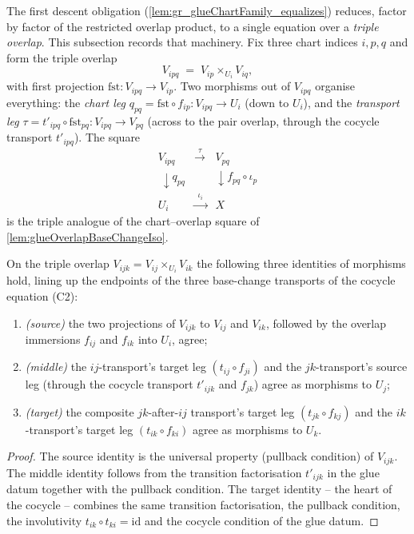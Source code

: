 The first descent obligation (\cref{lem:gr_glueChartFamily_equalizes}) reduces, factor
by factor of the restricted overlap product, to a single equation over a \emph{triple
overlap}. This subsection records that machinery. Fix three chart indices \(i, p, q\)
and form the triple overlap
\[
  V_{ipq} \;=\; V_{ip} \times_{U_i} V_{iq},
\]
with first projection \(\mathrm{fst} : V_{ipq} \to V_{ip}\). Two morphisms out of
\(V_{ipq}\) organise everything: the \emph{chart leg}
\(q_{pq} = \mathrm{fst}\circ f_{ip} : V_{ipq} \to U_i\) (down to \(U_i\)), and the
\emph{transport leg} \(\tau = t'_{ipq}\circ \mathrm{fst}_{pq} : V_{ipq} \to V_{pq}\)
(across to the pair overlap, through the cocycle transport \(t'_{ipq}\)). The square
\[
  \begin{array}{ccc}
    V_{ipq} & \xrightarrow{\ \ \tau\ \ } & V_{pq} \\
    \ \downarrow{\scriptstyle q_{pq}} & & \downarrow{\scriptstyle f_{pq}\circ \iota_p} \\
    U_i & \xrightarrow{\ \ \iota_i\ \ } & X
  \end{array}
\]
is the triple analogue of the chart--overlap square of \cref{lem:glueOverlapBaseChangeIso}.

\begin{lemma}\leanok
  \label{lem:gr_glueData_bridges}
  On the triple overlap \(V_{ijk} = V_{ij}\times_{U_i} V_{ik}\) the following three
  identities of morphisms hold, lining up the endpoints of the three base-change
  transports of the cocycle equation (C2):
  \begin{enumerate}
    \item \emph{(source)} the two projections of \(V_{ijk}\) to \(V_{ij}\) and \(V_{ik}\),
      followed by the overlap immersions \(f_{ij}\) and \(f_{ik}\) into \(U_i\),
      agree;
    \item \emph{(middle)} the \(ij\)-transport's target leg
      \((t_{ij}\circ f_{ji})\) and the \(jk\)-transport's source leg
      (through the cocycle transport \(t'_{ijk}\) and \(f_{jk}\)) agree as morphisms
      to \(U_j\);
    \item \emph{(target)} the composite \(jk\)-after-\(ij\) transport's target leg
      \((t_{jk}\circ f_{kj})\) and the \(ik\)-transport's target leg
      \((t_{ik}\circ f_{ki})\) agree as morphisms to \(U_k\).
  \end{enumerate}
\end{lemma}
\begin{proof}\leanok
  The source identity is the universal property (pullback condition) of \(V_{ijk}\).
  The middle identity follows from the transition factorisation
  \(t'_{ijk}\) in the glue datum together with the pullback condition.
  The target identity -- the heart of the cocycle -- combines the same transition
  factorisation, the pullback condition, the involutivity \(t_{ik}\circ t_{ki}=\mathrm{id}\)
  and the cocycle condition of the glue datum.
\end{proof}

